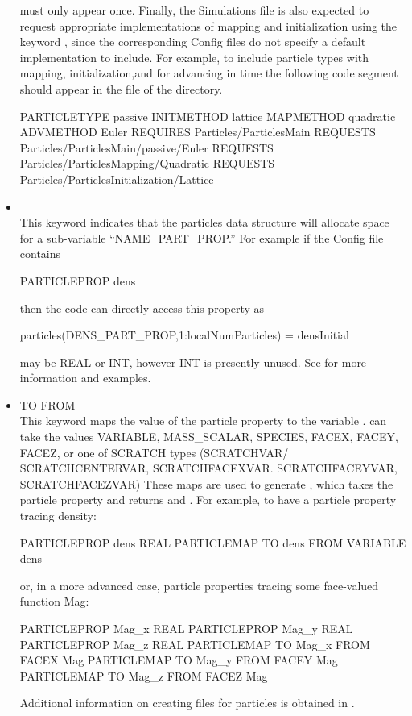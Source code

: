 \begin{itemize}
must only appear once.  Finally, the Simulations  file is
also expected to request appropriate implementations of mapping and 
initialization \subunits using the  keyword , since
the corresponding Config files do not specify a default implementation
to include. For example, to include  particle
types with  mapping,  initialization,and
 for advancing in time the following code segment should
appear in the  file of the  directory. 
\begin{codeseg}
PARTICLETYPE passive INITMETHOD lattice MAPMETHOD quadratic ADVMETHOD Euler
REQUIRES Particles/ParticlesMain
REQUESTS Particles/ParticlesMain/passive/Euler
REQUESTS Particles/ParticlesMapping/Quadratic
REQUESTS Particles/ParticlesInitialization/Lattice
\end{codeseg}

\item {}  \\
This keyword indicates that the particles data structure will allocate space for a 
sub-variable
``NAME\_\-PART\_\-PROP.'' For example if the Config file contains
\begin{codeseg}
PARTICLEPROP dens
\end{codeseg}
then the code can directly access this property as
\begin{codeseg}
particles(DENS_PART_PROP,1:localNumParticles) = densInitial
\end{codeseg}
 may be REAL or INT, however INT is presently unused.
See  for more information and examples.

\item {} TO  FROM  \\
This keyword maps the value of the particle property  to
the variable .  
 can take the values VARIABLE, MASS\_SCALAR, SPECIES,
FACEX, FACEY, FACEZ, or one of SCRATCH types (SCRATCHVAR/
SCRATCHCENTERVAR, SCRATCHFACEXVAR. SCRATCHFACEYVAR, SCRATCHFACEZVAR)
These maps are used to generate , which takes
the particle property  and returns  and .
For example, to have a particle property tracing density:
\begin{codeseg}
PARTICLEPROP dens REAL
PARTICLEMAP TO dens FROM VARIABLE dens
\end{codeseg}
or, in a more advanced case, particle properties tracing some face-valued function Mag:
\begin{codeseg}
PARTICLEPROP Mag_x REAL
PARTICLEPROP Mag_y REAL
PARTICLEPROP Mag_z REAL
PARTICLEMAP TO Mag_x FROM FACEX Mag
PARTICLEMAP TO Mag_y FROM FACEY Mag
PARTICLEMAP TO Mag_z FROM FACEZ Mag
\end{codeseg}
Additional information on creating  files for particles is obtained
in .




\end{itemize}
